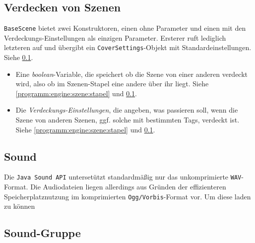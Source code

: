 \begin{sloppypar}
\subsection{Verdecken von Szenen} \label{programm:engine:szene:verdecken}

\texttt{BaseScene} bietet zwei Konstruktoren, einen ohne Parameter und einen
mit den Verdeckungs-Einstellungen als einzigen Parameter. Ersterer ruft lediglich
letzteren auf und übergibt ein \texttt{CoverSettings}-Objekt mit Standardeinstellungen.
Siehe \ref{programm:engine:szene:verdecken}.

\begin{itemize}
	\item Eine \textit{boolean}-Variable, die speichert ob die Szene von einer
	anderen verdeckt wird, also ob im Szenen-Stapel eine andere über ihr liegt.
	Siehe \ref{programm:engine:szene:stapel} und \ref{programm:engine:szene:verdecken}.
	\item Die \textit{Verdeckungs-Einstellungen}, die angeben, was passieren soll,
	wenn die Szene von anderen Szenen, ggf. solche mit bestimmten Tags, verdeckt ist.
	Siehe \ref{programm:engine:szene:stapel} und \ref{programm:engine:szene:verdecken}.
\end{itemize}

\subsection{Sound}

Die \texttt{Java Sound API} untersetützt standardmäßig nur das unkomprimierte \texttt{WAV}-Format. Die Audiodateien liegen allerdings 
aus Gründen der effizienteren Speicherplatznutzung im komprimierten \texttt{Ogg/Vorbis}-Format vor. Um diese laden zu können

\subsection{Sound-Gruppe} \label{programm:engine:sound:gruppe}

\end{sloppypar}